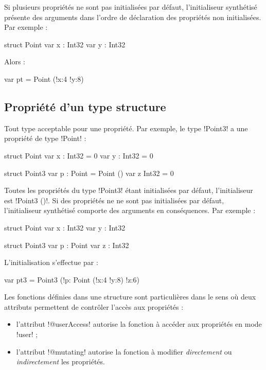 Si plusieurs propriétés ne sont pas initialisées par défaut, l'initialiseur synthétisé présente des arguments dans l'ordre de déclaration des propriétés non initialisées. Par exemple :

\begin{PLM}
struct Point {
  var x : Int32
  var y : Int32
}
\end{PLM}

Alors :
\begin{PLM}
var pt = Point (!x:4 !y:8)
\end{PLM}

\subsection{Propriété d'un type structure}

Tout type acceptable pour une propriété. Par exemple, le type \plm!Point3! a une propriété de type \plm!Point! :
\begin{PLM}
struct Point {
  var x : Int32 = 0
  var y : Int32 = 0
}

struct Point3 {
  var p : Point = Point ()
  var z Int32 = 0
}
\end{PLM}

Toutes les propriétés du type \plm!Point3! étant initialisées par défaut, l'initialiseur est \plm!Point3 ()!. Si des propriétés ne ne sont pas initialisées par défaut, l'initialiseur synthétisé comporte des arguments en conséquences. Par exemple :

\begin{PLM}
struct Point {
  var x : Int32
  var y : Int32
}

struct Point3 {
  var p : Point
  var z : Int32
}
\end{PLM}

L'initialisation s'effectue par : 
\begin{PLM}
var pt3 = Point3 (!p: Point (!x:4 !y:8) !z:6)
\end{PLM}













Les fonctions définies dans une structure sont particulières dans le sens où deux attributs permettent de contrôler l'accès aux propriétés :
\begin{itemize}
\item l'attribut \plm!@userAccess! autorise la fonction à accéder aux propriétés en mode \plm!user! ;
\item l'attribut \plm!@mutating! autorise la fonction à modifier \emph{directement} ou \emph{indirectement} les propriétés.
\end{itemize}


